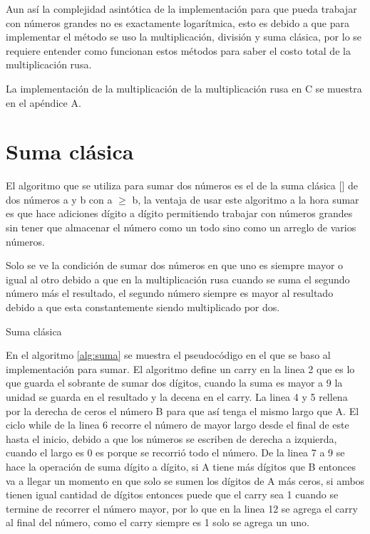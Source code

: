 \documentclass[10pt,journal,compsoc]{IEEEtran}
\begin{document}
Aun así la complejidad asintótica de la implementación para que pueda trabajar con números grandes no es exactamente logarítmica, esto es debido a que para implementar el método se uso la multiplicación, división y suma clásica, por lo se requiere entender como funcionan estos métodos para saber el costo total de la multiplicación rusa.


La implementación de la multiplicación de la multiplicación rusa en C se muestra en el apéndice A.
\section{Suma clásica}

El algoritmo que se utiliza para sumar dos números es el de la suma clásica [\cite{DK14}] de dos números a y b con a $\geq$ b, la ventaja de usar este algoritmo a la hora sumar es que hace adiciones dígito a dígito permitiendo trabajar con números grandes sin tener que almacenar el número como un todo sino como un arreglo de varios números.

Solo se ve la condición de sumar dos números en que uno es siempre mayor o igual al otro debido a que en la multiplicación rusa cuando se suma el segundo número más el resultado, el segundo número siempre es mayor al resultado debido a que esta constantemente siendo multiplicado por dos.

\begin{algorithm}

\caption{ Suma clásica}
\label{alg:suma}
\end{algorithm}


En el algoritmo \ref{alg:suma} se muestra el pseudocódigo en el que se baso al implementación para sumar. El algoritmo define un carry en la linea 2 que es lo que guarda el sobrante de sumar dos dígitos, cuando la suma es mayor a 9 la unidad se guarda en el resultado y la decena en el carry. La linea 4 y 5 rellena por la derecha de ceros el número B para que así tenga el mismo largo que A. El ciclo while de la linea 6 recorre el número de mayor largo desde el final de este hasta el inicio, debido a que los números se escriben de derecha a izquierda, cuando el largo es 0 es porque se recorrió todo el número. De la linea 7 a 9 se hace la operación de suma dígito a dígito, si A tiene más dígitos que B entonces va a llegar un momento en que solo se sumen los dígitos de A más ceros, si ambos tienen igual cantidad de dígitos entonces puede que el carry sea 1 cuando se termine de recorrer el número mayor, por lo que en la linea 12 se agrega el carry al final del número, como el carry siempre es 1 solo se agrega un uno.
\end{document}
